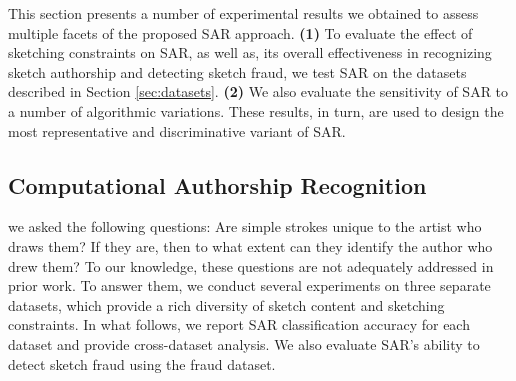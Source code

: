 This section presents a number of experimental results we obtained to assess multiple facets of the proposed SAR approach. \textbf{(1)} To evaluate the effect of sketching constraints on SAR, as well as, its overall effectiveness in recognizing sketch authorship and detecting sketch fraud, we test SAR on the datasets described in Section \ref{sec:datasets}. \textbf{(2)} We also evaluate the sensitivity of SAR to a number of algorithmic variations. These results, in turn, are used to design the most representative and discriminative variant of SAR. %

\vspace{-2mm}
\subsection{Computational Authorship Recognition}\label{subsec:recognition}
\vspace{-2mm}
we asked the following questions: Are simple strokes unique to the artist who draws them?  If they are, then to what extent can they identify the author who drew them? To our knowledge, these questions are not adequately addressed in prior work. To answer them, we conduct several experiments on three separate datasets, which provide a rich diversity of sketch content and sketching constraints. In what follows, we report SAR classification accuracy for each dataset and provide cross-dataset analysis. We also evaluate SAR's ability to detect sketch fraud using the fraud dataset.


